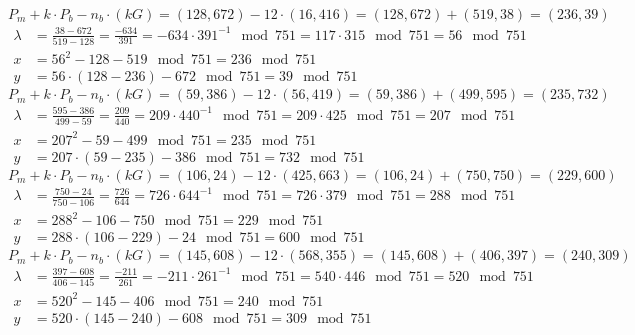 $P_m + k \cdot P_b - n_b \cdot (kG) = (128, 672) - 12 \cdot (16, 416) = (128, 672) + (519, 38)=(236, 39)$
\begin{equation*}
	\begin{aligned}
		\lambda &= \frac{38-672}{519-128} = \frac{-634}{391} = -634 \cdot 391^{-1}\mod{751} = 117 \cdot 315\mod{751} = 56\mod{751} \\
		x &= 56^2 - 128 - 519 \mod{751} = 236\mod{751} \\
		y &= 56 \cdot (128 - 236) - 672\mod{751} = 39\mod{751}
	\end{aligned}
\end{equation*}
$P_m + k \cdot P_b - n_b \cdot (kG) = (59, 386) - 12 \cdot (56, 419) = (59, 386) + (499, 595)=(235, 732)$
\begin{equation*}
	\begin{aligned}
		\lambda &= \frac{595-386}{499-59} = \frac{209}{440} = 209 \cdot 440^{-1}\mod{751} = 209 \cdot 425\mod{751} = 207\mod{751} \\
		x &= 207^2 - 59 - 499 \mod{751} = 235\mod{751} \\
		y &= 207 \cdot (59 - 235) - 386\mod{751} = 732\mod{751}
	\end{aligned}
\end{equation*}
$P_m + k \cdot P_b - n_b \cdot (kG) = (106, 24) - 12 \cdot (425, 663) = (106, 24) + (750, 750)=(229, 600)$
\begin{equation*}
	\begin{aligned}
		\lambda &= \frac{750-24}{750-106} = \frac{726}{644} = 726 \cdot 644^{-1}\mod{751} = 726 \cdot 379\mod{751} = 288\mod{751} \\
		x &= 288^2 - 106 - 750 \mod{751} = 229\mod{751} \\
		y &= 288 \cdot (106 - 229) - 24\mod{751} = 600\mod{751}
	\end{aligned}
\end{equation*}
$P_m + k \cdot P_b - n_b \cdot (kG) = (145, 608) - 12 \cdot (568, 355) = (145, 608) + (406, 397)=(240, 309)$
\begin{equation*}
	\begin{aligned}
		\lambda &= \frac{397-608}{406-145} = \frac{-211}{261} = -211 \cdot 261^{-1}\mod{751} = 540 \cdot 446\mod{751} = 520\mod{751} \\
		x &= 520^2 - 145 - 406 \mod{751} = 240\mod{751} \\
		y &= 520 \cdot (145 - 240) - 608\mod{751} = 309\mod{751}
	\end{aligned}
\end{equation*}

